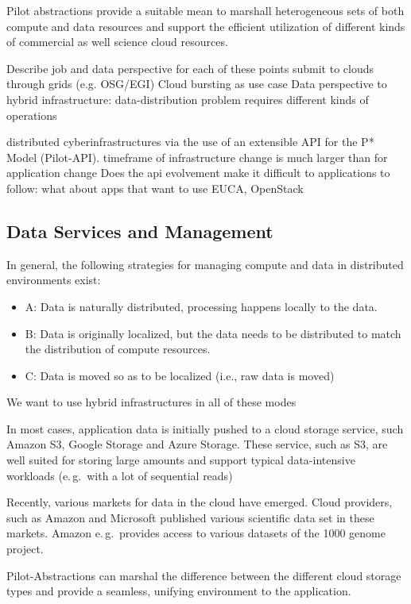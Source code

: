 \documentclass[times]{cpeauth}
\begin{document}
Pilot abstractions provide a suitable mean to marshall heterogeneous sets of 
both compute and data resources and support the efficient utilization of 
different kinds of commercial as well science cloud resources.

Describe job and data perspective for each of these points
submit to clouds through grids (e.g. OSG/EGI)
Cloud bursting as use case
Data perspective to hybrid infrastructure: data-distribution problem requires different kinds of operations

distributed cyberinfrastructures via the use of an extensible API for the P* Model (Pilot-API).
timeframe of infrastructure change is much larger than for application change
Does the api evolvement make it difficult to applications to follow: what 
about apps that want to use EUCA, OpenStack


\subsection{Data Services and Management}

In general, the following strategies for managing compute and
data in distributed environments exist:

\begin{itemize}
\item A: Data is naturally distributed, processing happens locally to the data. 
\item B: Data is originally localized, but the data needs to be distributed to match the distribution of compute resources.
\item C: Data is moved so as to be localized (i.e., raw data is moved)
\end{itemize}
We want to use hybrid infrastructures in all of these modes 



In most cases, application data is initially pushed to a cloud storage 
service, such Amazon S3, Google Storage and Azure Storage. These service, such 
as S3, are well suited for storing large amounts and support typical 
data-intensive workloads (e.\,g.\ with a lot of sequential reads)

Recently, various markets for data in the cloud have emerged. Cloud providers,
such as Amazon and Microsoft published various scientific data set in these
markets. Amazon e.\,g.\ provides access to various datasets of the 1000 genome
project.



Pilot-Abstractions can marshal the difference between the different cloud storage types and provide a seamless, unifying environment to the application.
\end{document}
